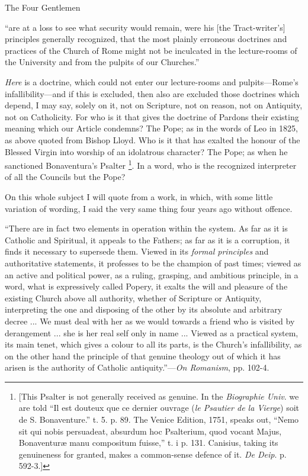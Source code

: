 The Four Gentlemen

``are
at a loss to see what security would remain, were his [the
Tract-writer's] principles generally recognized, that the most plainly
erroneous doctrines and practices of the Church of Rome might not be
inculcated in the lecture-rooms of the University and from the pulpits
of our Churches.''

\emph{Here} is a doctrine, which could not enter
our lecture-rooms and pulpits—Rome's infallibility—and if this is
excluded, then also are excluded those doctrines which depend, I may
say, solely on it, not on Scripture, not on reason, not on Antiquity,
not on Catholicity. For who is it that gives the doctrine of Pardons
their existing meaning which our Article condemns? The Pope; as in the
words of Leo in 1825, as above quoted from Bishop Lloyd. Who is it
that has exalted the honour of the Blessed Virgin into worship of an
idolatrous character? The Pope; as when he sanctioned Bonaventura's
Psalter \footnote{[This Psalter is not generally received as genuine. In the \emph{Biographie
Univ}. we are told ``Il est douteux que ce dernier ouvrage (\emph{le
Psautier de la Vierge}) soit de S. Bonaventure.'' t. 5. p. 89. The
Venice Edition, 1751, speaks out, ``Nemo sit qui nobis persuadeat,
absurdum hoc Psalterium, quod vocant Majus, Bonaventuræ manu
compositum fuisse,'' t. i p. 131. Canisius, taking its genuineness for
granted, makes a common-sense defence of it. \emph{De Deip}. p.
592-3.]}. In a word, who
is the recognized interpreter of all the Councils but the Pope?

On this whole subject I will quote from a work,
in which, with some little variation of wording, I said the very same
thing four years ago without offence.

``There
are in fact two elements in operation within the system. As far as it
is Catholic and Spiritual, it appeals to the Fathers; as far as it is
a corruption, it finds it necessary to supersede them. Viewed in its \emph{formal
principles} and authoritative statements, it professes to be the
champion of past times; viewed as an active and political power, as a
ruling, grasping, and ambitious principle, in a word, what is
expressively called Popery, it exalts the will and pleasure of the
existing Church above all authority, whether of Scripture or
Antiquity, interpreting the one and disposing of the other by its
absolute and arbitrary decree ... We must deal with her as we would
towards a friend who is visited by derangement ... she is her real
self only in name ... Viewed as a practical system, its main tenet,
which gives a colour to all its parts, is the Church's infallibility,
as on the other hand the principle of that genuine theology out of
which it has arisen is the authority of Catholic antiquity.''—\emph{On
Romanism}, pp. 102-4.

